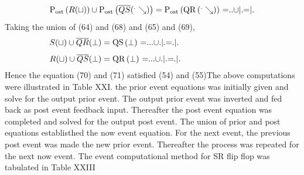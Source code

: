 \documentclass[10pt,journal]{IEEEtran}
\begin{document}
\begin{equation}
 \begin{minipage}{250pt}
\begin{flushleft} $\displaystyle \operatorname{P_{ost}}{\left(R{\left(\sqcup \right)} \right)} \cup \operatorname{P_{ost}}{\left(\overline{QS}{\left(^.\searrow \right)} \right)} = \operatorname{P_{ost}}{\left(\operatorname{QR}{\left(^.\searrow \right)} \right)}$  =$..$$\cup$$|.$=$|.$\end{flushleft}
 \end{minipage}
 \end{equation}
Taking the union of (64) and (68) and (65) and (69), 
\begin{equation}
 \begin{minipage}{250pt}
\begin{flushleft} $\displaystyle S{\left(\sqcup \right)} \cup \overline{QR}{\left(\bot \right)} = \operatorname{QS}{\left(\bot \right)}$  =$...$$\cup$$.|.$=$.|.$\end{flushleft}
 \end{minipage}
 \end{equation}
\begin{equation}
 \begin{minipage}{250pt}
\begin{flushleft} $\displaystyle R{\left(\sqcup \right)} \cup \overline{QS}{\left(\bot \right)} = \operatorname{QR}{\left(\bot \right)}$  =$...$$\cup$$.|.$=$.|.$\end{flushleft}
 \end{minipage}
 \end{equation}
Hence the equation (70) and (71) satisfied  (54) and (55)The above computations were illustrated     in Table XXI. the prior event equations was initially given and solve for     the output prior event. The output prior event was inverted and fed back as post event feedback input.     Thereafter the post event equation was completed and solved for the     output post event. The union of prior and post equations establisthed the     now event equation. For the next event, the previous post event was made     the new prior event. Thereafter the process was repeated for the next now     event. The event computational method for SR flip flop was tabulated in     Table XXIII
\end{document}
